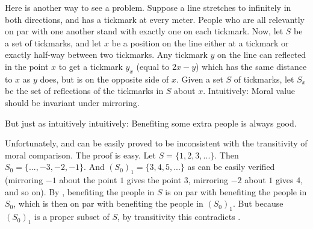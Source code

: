 Here is another way to see a problem. Suppose a line stretches to infinitely in both directions,
and has a tickmark at every meter. People who are all relevantly on par with one another stand with exactly 
one on each tickmark. Now, let $S$ be a set of tickmarks, and let $x$ be a position on the line either at a 
tickmark or exactly half-way between two tickmarks. Any tickmark $y$ on the line can reflected in the point 
$x$ to get a tickmark $y_x$ (equal to $2x-y$) which has the same distance to $x$ as $y$ does, but is on the 
opposite side of $x$. Given a set $S$ of tickmarks, let $S_x$ be the set of reflections of the tickmarks in 
$S$ about $x$. Intuitively:
Moral value should be invariant under mirroring.

But just as intuitively intuitively:
Benefiting some extra people is always good.

Unfortunately,  and  can be easily proved to be inconsistent with the 
transitivity of moral comparison. The proof is easy. Let $S=\{1,2,3,...\}$. Then $S_0=\{...,-3,-2,-1\}$.
And $(S_0)_1=\{3,4,5,...\}$ as can be easily verified (mirroring $-1$ about the point $1$ gives the point $3$,
mirroring $-2$ about $1$ gives $4$, and so on). By , benefiting the people in $S$ is 
on par with benefiting the people in $S_0$, which is then on par with benefiting the people in $(S_0)_1$.
But because $(S_0)_1$ is a proper subset of $S$, by transitivity this contradicts .

\chaptertail

